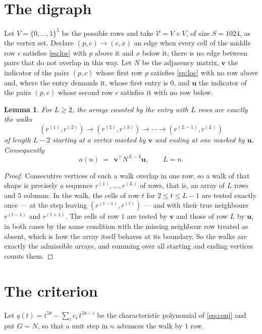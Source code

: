 \documentclass[11pt,a4paper]{article}
\theoremstyle{plain}
\newtheorem{lemma}[theorem]{Lemma}
\theoremstyle{definition}
\begin{document}
\section{The digraph}

Let $V=\{0,\dots,1\}^{5}$ be the possible rows and take
$\mathcal V=V\times V$, of size $S=1024$, as the vertex set. Declare $(p,c)\to(c,x)$ an edge
when every cell of the middle row $c$ satisfies \eqref{eq:loc} with $p$ above it and $x$
below it; there is no edge between pairs that do not overlap in this way. Let $N$ be the
adjacency matrix, $\mathbf{v}$ the indicator of the pairs $(p,c)$ whose first row $p$
satisfies \eqref{eq:loc} with no row above and, where the entry demands it, whose first entry is $0$, and $\mathbf{u}$ the indicator of
the pairs $(p,c)$ whose second row $c$ satisfies it with no row below.

\begin{lemma}\label{lem:walk}
For $L\ge2$, the arrays counted by the entry with $L$ rows are exactly the walks
\[
(r^{(1)},r^{(2)})\to(r^{(2)},r^{(3)})\to\cdots\to(r^{(L-1)},r^{(L)})
\]
of length $L-2$ starting at a vertex marked by $\mathbf{v}$ and ending at one marked by
$\mathbf{u}$. Consequently
\[
a(n)\;=\;\,\mathbf{v}^{\!\top}N^{\,L-2}\mathbf{u},\qquad L=n .
\]
\end{lemma}

\begin{proof}
Consecutive vertices of such a walk overlap in one row, so a walk of that shape is
precisely a sequence $r^{(1)},\dots,r^{(L)}$ of rows, that is, an array of $L$ rows
and $5$ columns. In the walk, the cells of row $t$ for $2\le t\le L-1$ are tested
exactly once --- at the step leaving $(r^{(t-1)},r^{(t)})$ --- and with their true
neighbours $r^{(t-1)}$ and $r^{(t+1)}$. The cells of row $1$ are tested by
$\mathbf{v}$ and those of row $L$ by $\mathbf{u}$, in both cases by the same condition
with the missing neighbour row treated as absent, which is how the array itself behaves at
its boundary. So the walks are exactly the admissible arrays, and summing over all starting
and ending vertices counts them.
\end{proof}

\section{The criterion}

Let $q(t)=t^{58}-\sum_i c_i\,t^{58-i}$ be the characteristic polynomial of
\eqref{eq:conj} and put $G=N$, so that a unit step in $n$ advances the walk by
$1$ row.
\end{document}
